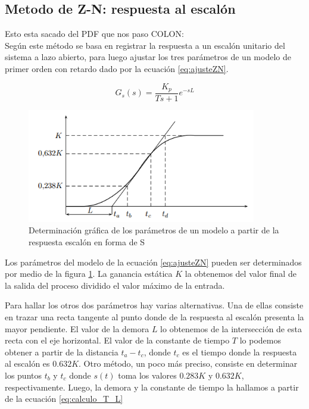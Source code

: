 \documentclass[10pt,conference,a4paper,onecolumn]{article}%
\begin{document}
\subsection{Metodo de Z-N: respuesta al escalón}
Esto esta sacado del PDF que nos paso COLON:\\

Según \cite{biblia_PID} este método se basa en registrar la respuesta a un escalón
unitario del sistema a lazo abierto, para luego ajustar los tres parámetros de un modelo
de primer orden con retardo dado por la ecuación \ref{eq:ajusteZN}.

\begin{equation}
G_s(s)=\frac{K_p}{Ts+1}e^{-sL}
\label{eq:ajusteZN}
\end{equation}


\begin{figure}[h]
\centering
\includegraphics[width=10cm]{./imagenes/escalon_z-n.png}
\caption{Determinación gráfica de los parámetros de un modelo a partir de
la respuesta escalón en forma de S}
\label{fig:escalon_zn}
\end{figure}




Los parámetros del modelo de la ecuación \ref{eq:ajusteZN} pueden ser determinados por medio de la figura \ref{fig:escalon_zn}. La ganancia estática $K$ la obtenemos del valor final de la salida del proceso dividido el valor máximo de la entrada. 

Para hallar los otros dos parámetros hay varias alternativas. Una de ellas consiste en trazar una recta tangente al punto donde de la respuesta al escalón presenta la mayor pendiente. El valor de la demora $L$ lo obtenemos de la intersección de esta recta con el eje horizontal. El valor de la constante de tiempo $T$ lo podemos obtener a partir de la distancia $t_a-t_c $, donde $t_c$ es el tiempo donde la respuesta al escalón es $0.632K$.
Otro método, un poco más preciso, consiste en determinar los puntos $t_b$ y $t_c$ donde $s(t)$ toma los valores $0.283K$ y $0.632K$, respectivamente. Luego, la demora y la constante de tiempo la hallamos a partir de la ecuación \ref{eq:calculo_T_L}
\end{document}
